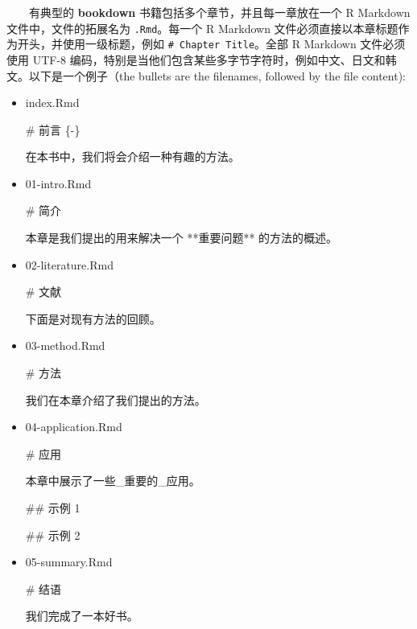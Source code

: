 \documentclass[
  12pt,
]{krantz}
\newenvironment{Shaded}{\begin{snugshade}}{\end{snugshade}}
\newcommand{\FunctionTok}[1]{\textcolor[rgb]{0.00,0.00,0.00}{#1}}
\newcommand{\NormalTok}[1]{#1}
\theoremstyle{definition}
\theoremstyle{definition}
\theoremstyle{definition}
\theoremstyle{definition}
\theoremstyle{remark}
\begin{document}
  有典型的 \textbf{bookdown} 书籍包括多个章节，并且每一章放在一个 R Markdown 文件中，文件的拓展名为 \texttt{.Rmd}。每一个 R Markdown 文件必须直接以本章标题作为开头，并使用一级标题，例如 \texttt{\#\ Chapter\ Title}。全部 R Markdown 文件必须使用 UTF-8 编码，特别是当他们包含某些多字节字符时，例如中文、日文和韩文。以下是一个例子（the bullets are the filenames, followed by the file content):

\begin{itemize}
\item
  index.Rmd

\begin{Shaded}
\begin{Highlighting}[]
\FunctionTok{\# 前言 \{{-}\}}

\NormalTok{在本书中，我们将会介绍一种有趣的方法。}
\end{Highlighting}
\end{Shaded}
\item
  01-intro.Rmd

\begin{Shaded}
\begin{Highlighting}[]
\FunctionTok{\# 简介}

\NormalTok{本章是我们提出的用来解决一个 **重要问题** 的方法的概述。}
\end{Highlighting}
\end{Shaded}
\item
  02-literature.Rmd

\begin{Shaded}
\begin{Highlighting}[]
\FunctionTok{\# 文献}

\NormalTok{下面是对现有方法的回顾。}
\end{Highlighting}
\end{Shaded}
\item
  03-method.Rmd

\begin{Shaded}
\begin{Highlighting}[]
\FunctionTok{\# 方法}

\NormalTok{我们在本章介绍了我们提出的方法。}
\end{Highlighting}
\end{Shaded}
\item
  04-application.Rmd

\begin{Shaded}
\begin{Highlighting}[]
\FunctionTok{\# 应用}

\NormalTok{本章中展示了一些\_重要的\_应用。}

\FunctionTok{\#\# 示例 1}

\FunctionTok{\#\# 示例 2}
\end{Highlighting}
\end{Shaded}
\item
  05-summary.Rmd

\begin{Shaded}
\begin{Highlighting}[]
\FunctionTok{\# 结语}

\NormalTok{我们完成了一本好书。}
\end{Highlighting}
\end{Shaded}
\end{itemize}
\end{document}
